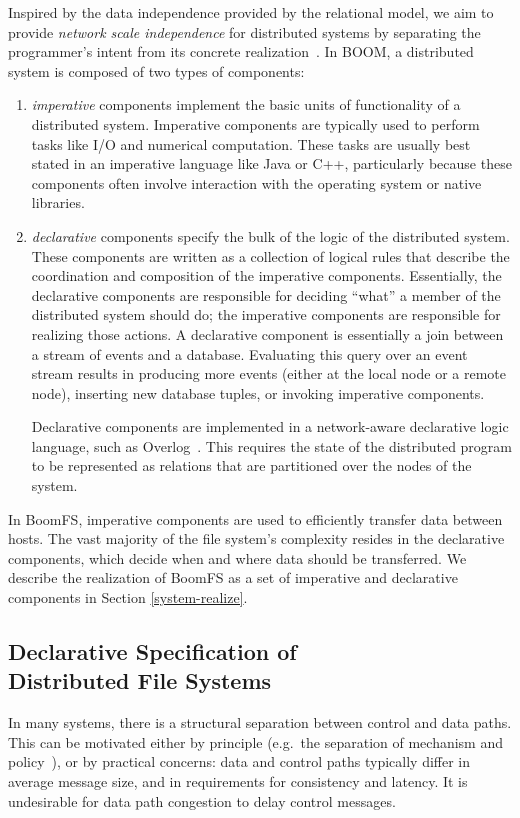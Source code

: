\documentclass[twocolumn]{article}
\begin{document}
Inspired by the data independence provided by the relational model, we
aim to provide \emph{network scale independence} for distributed
systems by separating the programmer's intent from its concrete
realization~\cite{network-data-indep}. In BOOM, a distributed system
is composed of two types of components:
\begin{enumerate}
\item
  \emph{imperative} components implement the basic units of
  functionality of a distributed system. Imperative components are
  typically used to perform tasks like I/O and numerical
  computation. These tasks are usually best stated in an imperative
  language like Java or C++, particularly because these components
  often involve interaction with the operating system or native
  libraries.

\item
  \emph{declarative} components specify the bulk of the logic of the
  distributed system. These components are written as a collection of
  logical rules that describe the coordination and composition of the
  imperative components. Essentially, the declarative components are
  responsible for deciding ``what'' a member of the distributed system
  should do; the imperative components are responsible for realizing
  those actions. A declarative component is essentially a join between
  a stream of events and a database. Evaluating this query over an
  event stream results in producing more events (either at the local
  node or a remote node), inserting new database tuples, or invoking
  imperative components.

  Declarative components are implemented in a network-aware
  declarative logic language, such as Overlog~\cite{dn-sigmod}. This
  requires the state of the distributed program to be represented as
  relations that are partitioned over the nodes of the system.
\end{enumerate}

In BoomFS, imperative components are used to efficiently transfer data
between hosts. The vast majority of the file system's complexity
resides in the declarative components, which decide when and where
data should be transferred. We describe the realization of BoomFS as a
set of imperative and declarative components in Section
\ref{system-realize}.

\subsection{Declarative Specification of\\Distributed File Systems}
In many systems, there is a structural separation between control and
data paths. This can be motivated either by principle (e.g.\ the separation
of mechanism and policy~\cite{hydra-policy-mech-sep}), or by practical
concerns: data and control paths typically differ in average message
size, and in requirements for consistency and latency. It is
undesirable for data path congestion to delay control messages.
\end{document}
